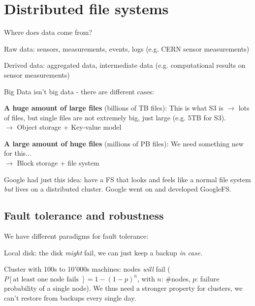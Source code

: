 \documentclass[11pt,oneside,a4paper]{article}
\begin{document}
\section{Distributed file systems}

Where does data come from?

\begin{compactitem}
	\item Raw data: sensors, measurements, events, logs (e.g. CERN sensor measurements)
	\item Derived data: aggregated data, intermediate data (e.g. computational results on sensor measurements)
\end{compactitem}

Big Data isn't big data - there are different cases:

\begin{compactitem}
	\item \textbf{A	huge amount of large files} (billions of TB files): This is what S3 is $\rightarrow$ lots of files, but single files are not extremely big, just large (e.g. 5TB for S3).\\
	$\rightarrow$ Object storage + Key-value model
	\item \textbf{A large amount of huge files} (millions of PB files): We need something new for this...\\
	$\rightarrow$ Block storage + file system
\end{compactitem}

Google had just this idea: have a FS that looks and feels like a normal file system \textit{but} lives on a distributed cluster. Google went on and developed GoogleFS.

\subsection{Fault tolerance and robustness}

We have different paradigms for fault tolerance:

\begin{compactitem}
	\item Local disk: the disk \textit{might} fail, we can just keep a backup \textit{in case.}
	\item Cluster with 100s to 10'000s machines: nodes \textit{will} fail ($P[\text{at least one node fails
	}] = 1-(1-p)^n$, with $n$: \#nodes, $p$: failure probability of a single node). We thus need a stronger property for clusters, we can't restore from backups every single day.
\end{compactitem}
\end{document}
